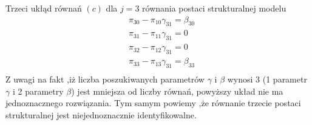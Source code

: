 Trzeci ukłąd równań $ (c) $ dla $ j=3 $ równania postaci strukturalnej modelu
\begin{align*}
& \pi _{30}-\pi _{10} \gamma _{31} = \beta _{30} \\
& \pi _{31}-\pi _{11} \gamma _{31} = 0 \\
& \pi _{32}-\pi _{12} \gamma _{31} = 0 \\
& \pi _{33}-\pi _{13} \gamma _{31} = \beta _{33} \\
\end{align*}
Z uwagi na fakt ,iż liczba poszukiwanych parametrów $ \gamma $ i $ \beta $ wynosi 3 (1 parametr $ \gamma $ i 2 parametry $ \beta $) jest mniejsza od liczby równań, powyższy układ nie ma jednoznacznego rozwiązania. Tym samym powiemy ,że równanie trzecie postaci strukturalnej jest niejednoznacznie identyfikowalne. 

